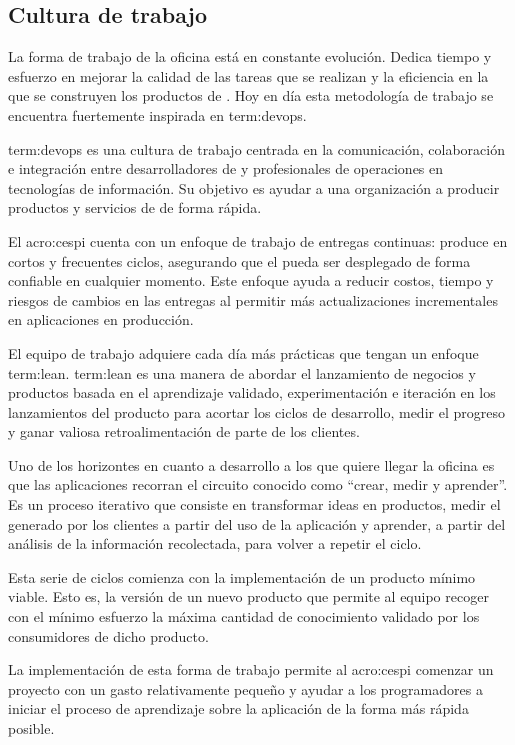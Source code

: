 \subsection{Cultura de trabajo}
\label{cultura_de_trabajo}

La forma de trabajo de la oficina está en constante evolución. Dedica tiempo y
esfuerzo en mejorar la calidad de las tareas que se realizan y la eficiencia en
la que se construyen los productos de . Hoy en día esta
metodología de trabajo se encuentra fuertemente inspirada en \gls{term:devops}.

\gls{term:devops} es una cultura de trabajo centrada en la comunicación,
colaboración e integración entre desarrolladores de  y
profesionales de operaciones en tecnologías de información. Su objetivo es
ayudar a una organización a producir productos y servicios de  de
forma rápida.

El \gls{acro:cespi} cuenta con un enfoque de trabajo de entregas continuas:
produce en cortos y frecuentes ciclos, asegurando que el  pueda
ser desplegado de forma confiable en cualquier momento. Este enfoque ayuda a
reducir costos, tiempo y riesgos de cambios en las entregas al permitir más
actualizaciones incrementales en aplicaciones en producción.

El equipo de trabajo adquiere cada día más prácticas que tengan un enfoque
\gls{term:lean}. \gls{term:lean} es una manera de abordar el lanzamiento de
negocios y productos basada en el aprendizaje validado, experimentación e
iteración en los lanzamientos del producto para acortar los ciclos de
desarrollo, medir el progreso y ganar valiosa retroalimentación de parte de los
clientes.

Uno de los horizontes en cuanto a desarrollo a los que quiere llegar la oficina
es que las aplicaciones recorran el circuito  conocido como
“crear, medir y aprender”. Es un proceso iterativo que consiste en transformar
ideas en productos, medir el  generado por los clientes a partir
del uso de la aplicación y aprender, a partir del análisis de la información
recolectada, para volver a repetir el ciclo.

Esta serie de ciclos comienza con la implementación de un producto mínimo
viable. Esto es, la versión de un nuevo producto que permite al equipo recoger
con el mínimo esfuerzo la máxima cantidad de conocimiento validado por los
consumidores de dicho producto.

La implementación de esta forma de trabajo permite al \gls{acro:cespi} comenzar un
proyecto con un gasto relativamente pequeño y ayudar a los programadores a
iniciar el proceso de aprendizaje sobre la aplicación de la forma más rápida
posible\cite[p~.2]{lean:the_lean_startup}.

